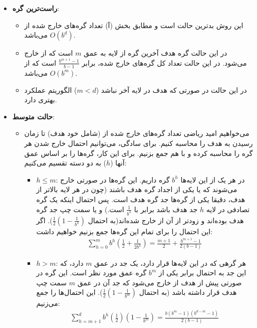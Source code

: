 \begin{ابجد}
\begin{itemize}
    \item \textbf{راست‌ترین گره}:
          \begin{itemize}
              \item[] این روش بدترین حالت  است و مطابق بخش (آ) تعداد گره‌های خارج شده از $O(b^d)$ می‌باشد.
              \item[] در این حالت گره هدف آخرین گره از لایه به عمق $m$ است که از  خارج می‌شود. در این حالت تعداد کل گره‌های خارج شده، برابر $\frac{b^{m+1}-1}{b-1}$ است که از $O(b^m)$ می‌باشد.
              \item[] در این حالت در صورتی که هدف در لایه آخر نباشد ($m<d$) الگوریتم  عملکرد بهتری دارد.
          \end{itemize}

    \item \textbf{حالت متوسط}:
          \begin{itemize}
              \item[] می‌خواهیم امید ریاضی تعداد گره‌های خارج شده از  (شامل خود هدف) تا زمان رسیدن به هدف را محاسبه کنیم. برای سادگی، می‌توانیم احتمال خارج شدن هر گره را محاسبه کرده و با هم جمع بزنیم. برای این کار، گره‌ها را بر اساس عمق آنها ($h$) به دو دسته تقسیم می‌کنیم:
                  \begin{itemize}
                      \item[] $h \leq m$: در هر یک از این لایه‌ها $b^h$ گره داریم. این گره‌ها در صورتی خارج می‌شوند که یا یکی از اجداد گره هدف باشند (چون در هر لایه بالاتر از هدف، دقیقا یکی از گره‌ها جد گره هدف است. پس احتمال اینکه یک گره تصادفی در لایه $h$ جد هدف باشد برابر با $\frac{1}{b^h}$ است.) و یا سمت چپ جد گره هدف بوده‌اند و زودتر از آن از  خارج شده‌اند(به احتمال $\frac{1}{2}(1 - \frac{1}{b^h})$). اگر این احتمال را برای تمام این گره‌ها جمع بزنیم خواهیم داشت:
                          \begin{align*}
                              \sum_{h=0}^{m} b^h(\frac{1}{2} + \frac{1}{2b^h}) = \frac{m+1}{2} + \frac{b^{m+1}-1}{2(b-1)}
                          \end{align*}
                      \item[] $h > m$: هر گرهی که در این لایه‌ها قرار دارد، یک جد در عمق $m$ دارد، که این جد به احتمال برابر یکی از $b^m$ گره عمق مورد نظر است. این گره در صورتی پیش از هدف از  خارج می‌شود که جد آن در عمق $m$ سمت چپ هدف قرار داشته باشد (به احتمال $\frac{1}{2}(1 - \frac{1}{b^m})$). این احتمال‌ها را جمع می‌زنیم:
                          \begin{align*}
                              \sum_{h=m+1}^{d} b^h(\frac{1}{2})(1 - \frac{1}{b^m}) = \frac{b(b^m-1)(b^{d-m}-1)}{2(b-1)}

\end{align*}
\end{itemize}
\end{itemize}
\end{itemize}
\end{ابجد}

